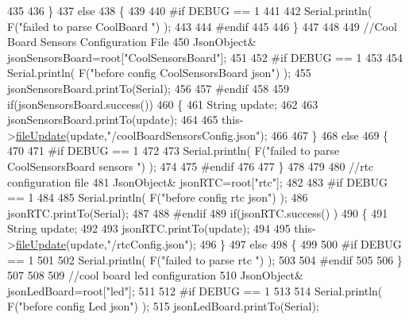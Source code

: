 \begin{DoxyCode}
435         
436     \}
437     \textcolor{keywordflow}{else}
438     \{
439     
440 \textcolor{preprocessor}{    #if DEBUG == 1 }
441 
442         Serial.println( F(\textcolor{stringliteral}{"failed to parse CoolBoard "}) );
443     
444 \textcolor{preprocessor}{    #endif}
445 
446     \}       
447 
448     
449     \textcolor{comment}{//Cool Board Sensors Configuration File}
450         JsonObject& jsonSensorsBoard=root[\textcolor{stringliteral}{"CoolSensorsBoard"}];
451 
452 \textcolor{preprocessor}{#if DEBUG == 1 }
453 
454     Serial.println( F(\textcolor{stringliteral}{"before config CoolSensorsBoard json"}) );
455     jsonSensorsBoard.printTo(Serial);
456 
457 \textcolor{preprocessor}{#endif }
458     
459     \textcolor{keywordflow}{if}(jsonSensorsBoard.success())
460     \{   
461         String update;
462     
463         jsonSensorsBoard.printTo(update);
464 
465         this->\hyperlink{class_cool_file_system_a13f2958f5b87757c31fc53797a30d23a}{fileUpdate}(update,\textcolor{stringliteral}{"/coolBoardSensorsConfig.json"});      
466 
467     \}
468     \textcolor{keywordflow}{else}
469     \{
470 
471 \textcolor{preprocessor}{    #if DEBUG == 1}
472 
473         Serial.println( F(\textcolor{stringliteral}{"failed to parse CoolSensorsBoard sensors "}) );   
474     
475 \textcolor{preprocessor}{    #endif}
476 
477     \}
478 
479     
480     \textcolor{comment}{//rtc configuration file}
481         JsonObject& jsonRTC=root[\textcolor{stringliteral}{"rtc"}];
482 
483 \textcolor{preprocessor}{#if DEBUG == 1 }
484     
485     Serial.println( F(\textcolor{stringliteral}{"before config rtc json"}) );
486     jsonRTC.printTo(Serial);
487 
488 \textcolor{preprocessor}{#endif}
489     \textcolor{keywordflow}{if}(jsonRTC.success() )
490     \{
491         String update;
492 
493         jsonRTC.printTo(update);
494 
495         this->\hyperlink{class_cool_file_system_a13f2958f5b87757c31fc53797a30d23a}{fileUpdate}(update,\textcolor{stringliteral}{"/rtcConfig.json"});           
496     \}
497     \textcolor{keywordflow}{else}
498     \{
499     
500 \textcolor{preprocessor}{    #if DEBUG == 1 }
501 
502         Serial.println( F(\textcolor{stringliteral}{"failed to parse rtc "}) );
503     
504 \textcolor{preprocessor}{    #endif}
505 
506     \}
507     
508     
509         \textcolor{comment}{//cool board led configuration}
510         JsonObject& jsonLedBoard=root[\textcolor{stringliteral}{"led"}];
511     
512 \textcolor{preprocessor}{#if DEBUG == 1 }
513 
514     Serial.println( F(\textcolor{stringliteral}{"before config Led json"}) );
515     jsonLedBoard.printTo(Serial);

\end{DoxyCode}
